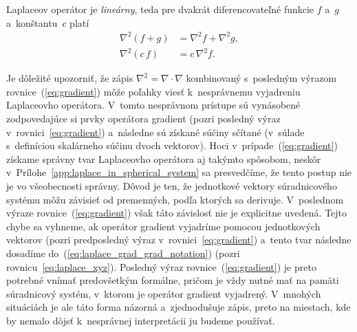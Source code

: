 \documentclass[a4paper,12pt]{book}
\begin{document}
Laplaceov operátor je \emph{lineárny}, teda pre dvakrát diferencovateľné 
funkcie $f$ a~$g$ a~konštantu~$c$ platí
%
\begin{align}
\label{eq:laplace_additivity}
\nabla^2 \left(f + g \right) &= \nabla^2 f + \nabla^2 g{,}\\
%
\label{eq:laplace_homogenity}
\nabla^2 (c \, f) &= c \, \nabla^2 f{.}
\end{align}

Je dôležité upozorniť, že zápis $\nabla^2 = \nabla \cdot \nabla$ kombinovaný 
s~posledným výrazom rovnice~(\ref{eq:gradient}) môže poľahky viesť 
k~nesprávnemu vyjadreniu Laplaceovho operátora.  V~tomto nesprávnom prístupe sú 
vynásobené zodpovedajúce si prvky operátora gradient (pozri posledný výraz 
v~rovnici~\ref{eq:gradient}) a~následne sú získané súčiny sčítané (v~súlade 
s~definíciou skalárneho súčinu dvoch vektorov).  Hoci 
v~prípade~(\ref{eq:gradient}) získame správny tvar Laplaceovho operátora aj 
takýmto spôsobom, neskôr v~Prílohe~\ref{app:laplace_in_spherical_system} sa 
presvedčíme, že tento postup nie je vo všeobecnosti správny.  Dôvod je ten, že 
jednotkové vektory súradnicového systému môžu závisieť od premenných, podľa 
ktorých sa derivuje.  V~poslednom výraze rovnice~(\ref{eq:gradient}) však táto 
závislosť nie je explicitne uvedená.  Tejto chybe sa vyhneme, ak operátor 
gradient vyjadríme pomocou jednotkových vektorov (pozri predposledný výraz 
v~rovnici~\ref{eq:gradient}) a~tento tvar následne dosadíme 
do~(\ref{eq:laplace_grad_grad_notation}) (pozri rovnicu~\ref{eq:laplace_xyz}).  
Posledný výraz rovnice~(\ref{eq:gradient}) je preto potrebné vnímať 
predovšetkým formálne, pričom je vždy nutné mať na pamäti súradnicový systém, 
v~ktorom je operátor gradient vyjadrený.  V~mnohých situáciách je ale táto 
forma názorná a~zjednodušuje zápis, preto na miestach, kde by nemalo dôjsť 
k~nesprávnej interpretácii ju budeme používať.
\end{document}
